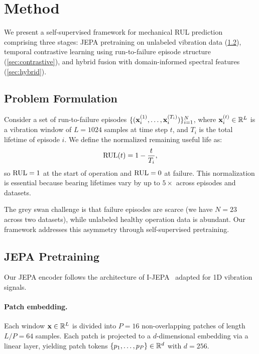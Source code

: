 \section{Method}
\label{sec:method}

We present a self-supervised framework for mechanical RUL prediction comprising three stages: JEPA pretraining on unlabeled vibration data (\cref{sec:jepa}), temporal contrastive learning using run-to-failure episode structure (\cref{sec:contrastive}), and hybrid fusion with domain-informed spectral features (\cref{sec:hybrid}). 

\subsection{Problem Formulation}
\label{sec:problem}

Consider a set of run-to-failure episodes $\{(\mathbf{x}_i^{(1)}, \ldots, \mathbf{x}_i^{(T_i)})\}_{i=1}^N$, where $\mathbf{x}_i^{(t)} \in \mathbb{R}^{L}$ is a vibration window of $L = 1024$ samples at time step $t$, and $T_i$ is the total lifetime of episode $i$. We define the normalized remaining useful life as:
\begin{equation}
  \text{RUL}(t) = 1 - \frac{t}{T_i},
  \label{eq:rul}
\end{equation}
so $\text{RUL} = 1$ at the start of operation and $\text{RUL} = 0$ at failure. This normalization is essential because bearing lifetimes vary by up to $5\times$ across episodes and datasets.

The grey swan challenge is that failure episodes are scarce (we have $N = 23$ across two datasets), while unlabeled healthy operation data is abundant. Our framework addresses this asymmetry through self-supervised pretraining.

\subsection{JEPA Pretraining}
\label{sec:jepa}

Our JEPA encoder follows the architecture of I-JEPA~\citep{assran2023ijepa} adapted for 1D vibration signals.

\paragraph{Patch embedding.} Each window $\mathbf{x} \in \mathbb{R}^L$ is divided into $P = 16$ non-overlapping patches of length $L/P = 64$ samples. Each patch is projected to a $d$-dimensional embedding via a linear layer, yielding patch tokens $\{p_1, \ldots, p_P\} \in \mathbb{R}^d$ with $d = 256$.

